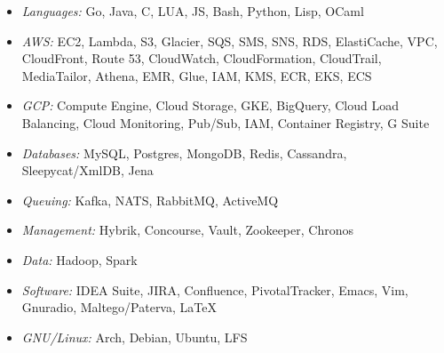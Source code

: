 \documentclass{article}
\begin{document}
\vspace{5pt}\begin{multicols}{2}
  \begin{small}
    \begin{itemize}[leftmargin=*,label=]
    \item\begin{minipage}[t]{\linewidth}{\textit{Languages:} Go, Java, C, LUA, JS, Bash, Python, Lisp, OCaml}\end{minipage}
    \item\begin{minipage}[t]{\linewidth}{\textit{AWS:} EC2, Lambda, S3, Glacier, SQS, SMS, SNS, RDS, ElastiCache, VPC, CloudFront,
      Route 53, CloudWatch, CloudFormation, CloudTrail, MediaTailor, Athena, EMR, Glue, IAM, KMS, ECR, EKS, ECS}\end{minipage}
    \item\begin{minipage}[t]{\linewidth}{\textit{GCP:} Compute Engine, Cloud Storage, GKE, BigQuery, Cloud Load Balancing,
      Cloud Monitoring, Pub/Sub, IAM, Container Registry, G Suite}\end{minipage}
    \item\begin{minipage}[t]{\linewidth}{\textit{Databases:} MySQL, Postgres, MongoDB, Redis, Cassandra, Sleepycat/XmlDB, Jena}\end{minipage}
    \item\begin{minipage}[t]{\linewidth}{\textit{Queuing:} Kafka, NATS, RabbitMQ, ActiveMQ}\end{minipage}
    \item\begin{minipage}[t]{\linewidth}{\textit{Management:} Hybrik, Concourse, Vault, Zookeeper, Chronos}\end{minipage}
    \item\begin{minipage}[t]{\linewidth}{\textit{Data:} Hadoop, Spark}\end{minipage}
    \item\begin{minipage}[t]{\linewidth}{\textit{Software:} IDEA Suite, JIRA, Confluence, PivotalTracker,
      Emacs, Vim, Gnuradio, Maltego/Paterva, \LaTeX}\end{minipage}
    \item\begin{minipage}[t]{\linewidth}{\textit{GNU/Linux:} Arch, Debian, Ubuntu, LFS}\end{minipage}
    \end{itemize}
  \end{small} 
\end{multicols}
\end{document}
